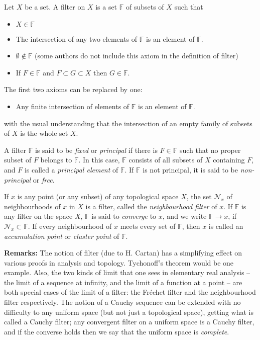 \documentclass[12pt]{article}
\begin{document}
\newcommand{\F}{\mathbb{F}}
Let $X$ be a set. A filter on $X$ is a set $\F$ of subsets of $X$
such that

\begin{itemize}
\item $X\in\F$
\item The intersection of any two elements of $\F$ is an element of $\F$.
\item $\emptyset\notin\F$ (some authors do not include this axiom in the definition of filter)
\item If $F\in\F$ and $F\subset G\subset X$ then $G\in\F$.
\end{itemize}
The first two axioms can be replaced by one:
\begin{itemize}
\item
Any finite intersection of elements of $\F$ is an element of $\F$.
\end{itemize}
with the usual understanding that the intersection of an empty family
of subsets of $X$ is the whole set $X$.

A filter $\F$ is said to be \emph{fixed}
or \emph{principal} if there is $F\in \F$ such that no proper subset of $F$ belongs to $\F$. In this case, $\F$ consists of all subsets of $X$ containing $F$, and $F$ is called a \emph{principal element} of $\F$. If $\F$ is not principal, it is said to be \emph{non-principal} or \emph{free}.

If $x$ is any point (or any subset) of any topological space $X$,
the set $\mathcal{N}_x$ of neighbourhoods of $x$ in $X$ is a filter,
called the \emph{neighbourhood filter} of $x$.
If $\F$ is any filter on the space $X$, $\F$
is said to \emph{converge} to $x$, and we write $\F\to x$,
if $\mathcal{N}_x\subset\F$.
If every neighbourhood of $x$ meets every set of $\F$, then
$x$ is called an \emph{accumulation point}
or \emph{cluster point} of $\F$.

\textbf{Remarks: }
The notion of filter (due to H. Cartan) has a simplifying effect on
various proofs in analysis and topology.
Tychonoff's theorem would be one example.
Also, the two kinds of limit that one sees in elementary real
analysis -- the limit of a sequence at infinity, and the limit
of a function at a point -- are both special cases of the limit
of a filter: the Fr\'echet filter and the neighbourhood filter
respectively.
The notion of a Cauchy sequence can be extended with no difficulty
to any uniform space (but not just a topological space),
getting what is called a Cauchy filter; any convergent filter on a
uniform space is a Cauchy filter, and if the converse holds then
we say that the uniform space is \emph{complete}.
\end{document}
